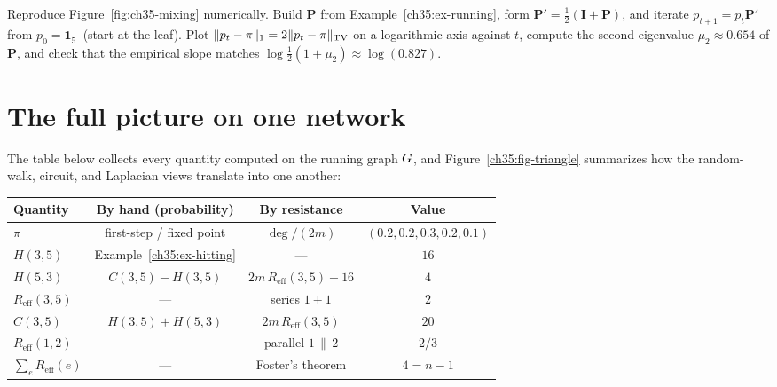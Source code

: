 \begin{labbox}
Reproduce Figure~\ref{fig:ch35-mixing} numerically. Build $\mathbf{P}$ from Example~\ref{ch35:ex-running}, form $\mathbf{P}'=\tfrac12(\mathbf{I}+\mathbf{P})$, and iterate $p_{t+1}=p_t\mathbf{P}'$ from $p_0=\mathbf{1}_5^\top$ (start at the leaf). Plot $\lVert p_t-\pi\rVert_1 = 2\lVert p_t-\pi\rVert_{\mathrm{TV}}$ on a logarithmic axis against $t$, compute the second eigenvalue $\mu_2\approx 0.654$ of $\mathbf{P}$, and check that the empirical slope matches $\log\tfrac12(1+\mu_2)\approx\log(0.827)$.
\end{labbox}

\section{The full picture on one network}

The table below collects every quantity computed on the running graph $G$, and Figure~\ref{ch35:fig-triangle} summarizes how the random-walk, circuit, and Laplacian views translate into one another:

\begin{center}
\begin{tabular}{lccc}
\toprule
Quantity & By hand (probability) & By resistance & Value\\
\midrule
$\pi$ & first-step / fixed point & $\deg/(2m)$ & $(0.2,0.2,0.3,0.2,0.1)$\\
$H(3,5)$ & Example~\ref{ch35:ex-hitting} & --- & $16$\\
$H(5,3)$ & $C(3,5)-H(3,5)$ & $2m\,R_{\mathrm{eff}}(3,5)-16$ & $4$\\
$R_{\mathrm{eff}}(3,5)$ & --- & series $1{+}1$ & $2$\\
$C(3,5)$ & $H(3,5){+}H(5,3)$ & $2m\,R_{\mathrm{eff}}(3,5)$ & $20$\\
$R_{\mathrm{eff}}(1,2)$ & --- & parallel $1\,\parallel\,2$ & $2/3$\\
$\sum_e R_{\mathrm{eff}}(e)$ & --- & Foster's theorem & $4=n{-}1$\\
\bottomrule
\end{tabular}
\end{center}

